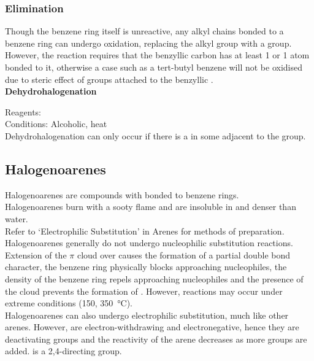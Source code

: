 \documentclass[../main]{subfiles}
\begin{document}
	\subsubsection{Elimination}

	Though the benzene ring itself is unreactive, any alkyl chains bonded to a benzene ring can undergo oxidation, replacing the alkyl group with a  group. However, the reaction requires that the benzyllic carbon has at least 1  or 1  atom bonded to it, otherwise a case such as a tert-butyl benzene will not be oxidised due to steric effect of  groups attached to the benzyllic . \\

	\noindent \textbf{Dehydrohalogenation}

	Reagents:  \\
	Conditions: Alcoholic, heat \\

	Dehydrohalogenation can only occur if there is a  in some  adjacent to the  group. \\

	\subsection{Halogenoarenes}

	Halogenoarenes are compounds with  bonded to benzene rings. \\

	Halogenoarenes burn with a sooty flame and are insoluble in and denser than water. \\

	Refer to `Electrophilic Substitution' in Arenes for methods of preparation. \\

	Halogenoarenes generally do not undergo nucleophilic substitution reactions. Extension of the \(\pi\)  cloud over  causes the formation of a partial double bond character, the benzene ring physically blocks approaching nucleophiles, the  density of the benzene ring repels approaching nucleophiles and the presence of the  cloud prevents the formation of . However, reactions may occur under extreme conditions (\SI{150}{\atm}, \SI{350}{\celsius}).\\

	Halogenoarenes can also undergo electrophilic substitution, much like other arenes. However,  are electron-withdrawing and electronegative, hence they are deactivating groups and the reactivity of the arene decreases as more  groups are added.  is a 2,4-directing group.
\end{document}
